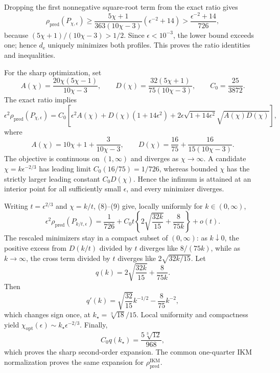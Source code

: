 Dropping the first nonnegative square-root term from the exact ratio gives
\[
 \rho_{\mathrm{pred}}(P_{\chi,\epsilon})
 \ge \frac{5\chi+1}{363(10\chi-3)}(\epsilon^{-2}+14)
 >\frac{\epsilon^{-2}+14}{726}, \tag{7}
\]
because \((5\chi+1)/(10\chi-3)>1/2\). Since \(\epsilon<10^{-3}\), the lower bound exceeds one; hence \(d_{\mathrm e}\) uniquely minimizes both profiles. This proves the ratio identities and inequalities.

For the sharp optimization, set
\[
 A(\chi)=\frac{20\chi(5\chi-1)}{10\chi-3},
 \qquad
 D(\chi)=\frac{32(5\chi+1)}{75(10\chi-3)},
 \qquad C_0=\frac{25}{3872}.
\]
The exact ratio implies
\[
 \epsilon^2\rho_{\mathrm{pred}}(P_{\chi,\epsilon})
 =C_0\left[\epsilon^2A(\chi)+D(\chi)(1+14\epsilon^2)
 +2\epsilon\sqrt{1+14\epsilon^2}\sqrt{A(\chi)D(\chi)}\right], \tag{8}
\]
where
\[
 A(\chi)=10\chi+1+\frac3{10\chi-3},
 \qquad
 D(\chi)=\frac{16}{75}+\frac{16}{15(10\chi-3)}. \tag{9}
\]
The objective is continuous on \((1,\infty)\) and diverges as \(\chi\to\infty\). A candidate \(\chi=k\epsilon^{-2/3}\) has leading limit \(C_0(16/75)=1/726\), whereas bounded \(\chi\) has the strictly larger leading constant \(C_0D(\chi)\). Hence the infimum is attained at an interior point for all sufficiently small \(\epsilon\), and every minimizer diverges.

Writing \(t=\epsilon^{2/3}\) and \(\chi=k/t\), (8)--(9) give, locally uniformly for \(k\in(0,\infty)\),
\[
 \epsilon^2\rho_{\mathrm{pred}}(P_{k/t,\epsilon})
 =\frac1{726}+C_0t\left\{2\sqrt{\frac{32k}{15}}+\frac8{75k}\right\}+o(t). \tag{10}
\]
The rescaled minimizers stay in a compact subset of \((0,\infty)\): as \(k\downarrow0\), the positive excess from \(D(k/t)\) divided by \(t\) diverges like \(8/(75k)\), while as \(k\to\infty\), the cross term divided by \(t\) diverges like \(2\sqrt{32k/15}\). Let
\[
 q(k)=2\sqrt{\frac{32k}{15}}+\frac8{75k}.
\]
Then
\[
 q'(k)=\sqrt{\frac{32}{15}}k^{-1/2}-\frac8{75}k^{-2},
\]
which changes sign once, at \(k_\star=\sqrt[3]{18}/15\). Local uniformity and compactness yield \(\chi_{\mathrm{opt}}(\epsilon)\sim k_\star\epsilon^{-2/3}\). Finally,
\[
 C_0q(k_\star)=\frac{5\sqrt[3]{12}}{968},
\]
which proves the sharp second-order expansion. The common one-quarter IKM normalization proves the same expansion for \(\rho_{\mathrm{pred}}^{\mathrm{IKM}}\).